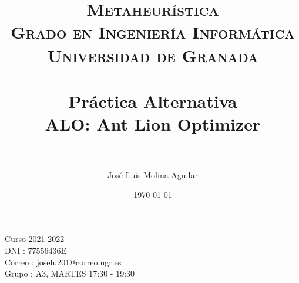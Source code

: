 

\everymath{\displaystyle}

\title{	
\normalfont \normalsize 
\textsc{\textbf{Metaheurística} \\ Grado en Ingeniería Informática \\ Universidad de Granada} \\ [25pt] %
\horrule{0.5pt} \\[0.4cm] %
\huge Práctica Alternativa\\ ALO: Ant Lion Optimizer \\ %
\horrule{2pt} \\[0.5cm] %
}

\author{José Luis Molina Aguilar} %

\date{\normalsize\today} %






\maketitle %
  \begin{large}
    \centering
  \vfill
  
  Curso 2021-2022\\
  DNI : 77556436E\\
  Correo : joselu201@correo.ugr.es\\
  Grupo : A3, MARTES 17:30 - 19:30
  \vfill
  \end{large}
\newpage %

\tableofcontents %

\listoffigures


\newpage




